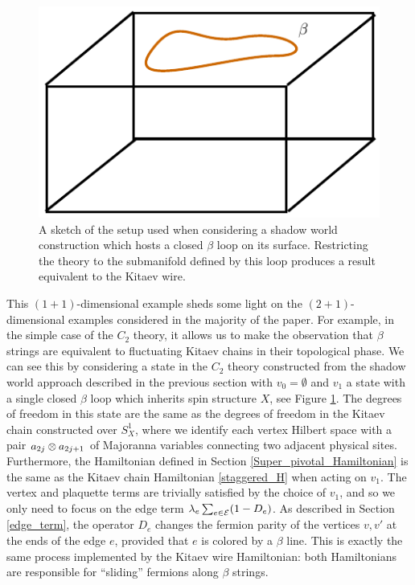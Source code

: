 \begin{figure}
\centering
\includegraphics{box_beta_loop.pdf}
\caption{ \label{box_beta_loop} A sketch of the setup used when considering a shadow world construction which hosts a closed $\beta$ loop on its surface. Restricting the theory to the submanifold defined by this loop produces a result equivalent to the Kitaev wire. }
\end{figure}

This $(1+1)$-dimensional example sheds some light on the $(2+1)$-dimensional examples 
considered in the majority of the paper. 
For example, in the simple case of the $C_2$ theory, it allows us to make the observation that
$\beta$ strings are equivalent to fluctuating Kitaev chains in their topological phase. 
We can see this by considering a state in the $C_2$ theory constructed 
from the shadow world approach described in the previous section with $v_0 = \emptyset$ and $v_1$ a state 
with a single closed $\beta$ loop which inherits spin structure $X$, see Figure \ref{box_beta_loop}.
The degrees of freedom in this state are the same as 
the degrees of freedom in the Kitaev chain constructed over $S^1_X$, 
where we identify each vertex Hilbert space with a pair $a_{2j}\otimes a_{2j+1}$ of Majoranna
variables connecting two adjacent physical sites. 
Furthermore, the Hamiltonian defined in Section \ref{Super_pivotal_Hamiltonian} is the same as the Kitaev 
chain Hamiltonian \eqref{staggered_H} when acting on $v_1$. 
The vertex and plaquette terms are trivially satisfied by the choice of $v_1$, and so we only need to focus 
on the edge term $\lambda_e \sum_{e\in \mathcal{E}} (1-D_e)$. As described in Section \ref{edge_term}, 
the operator $D_e$ changes the fermion parity of the vertices $v,v'$ at the ends of the edge $e$, provided
that $e$ is colored by a $\beta$ line. 
This is exactly the same process implemented by the Kitaev wire Hamiltonian: both Hamiltonians
 are responsible for ``sliding'' fermions along $\beta$ strings.  


